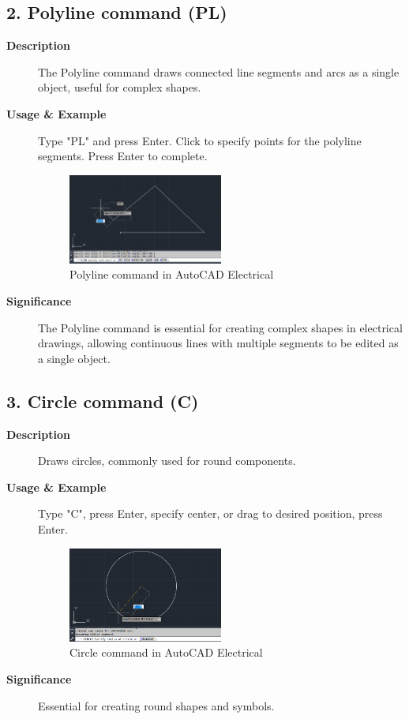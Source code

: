 \documentclass[12pt]{article}
\begin{document}
\subsection*{2. Polyline command (PL)}
\begin{description}
    \item [\textbf{Description}] The Polyline command draws connected line segments and arcs as a single object, useful for complex shapes.
    \item [\textbf{Usage \& Example}] Type "PL" and press Enter. Click to specify points for the polyline segments. Press Enter to complete.
          \begin{figure}[H]
              \centering
              \includegraphics[width=0.5\textwidth]{polyline_command.png}
              \caption{Polyline command in AutoCAD Electrical}
          \end{figure}
    \item [\textbf{Significance}] The Polyline command is essential for creating complex shapes in electrical drawings, allowing continuous lines with multiple segments to be edited as a single object.
\end{description}

\subsection*{3. Circle command (C)}
\begin{description}
    \item [\textbf{Description}] Draws circles, commonly used for round components.
    \item [\textbf{Usage \& Example}] Type "C", press Enter, specify center, or drag to desired position, press Enter.
          \begin{figure}[H]
              \centering
              \includegraphics[width=0.5\textwidth]{circle_command.png}
              \caption{Circle command in AutoCAD Electrical}
          \end{figure}
    \item [\textbf{Significance}] Essential for creating round shapes and symbols.
\end{description}
\end{document}

